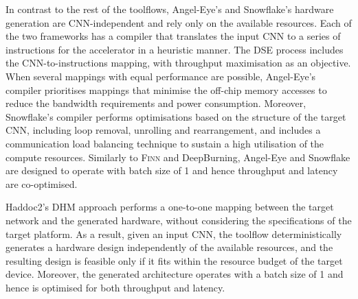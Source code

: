 \documentclass[format=acmsmall, review=false, screen=true]{acmart}
\begin{document}
In contrast to the rest of the toolflows, Angel-Eye's {\color{black}and Snowflake's} hardware generation are CNN-independent and rely only on the available resources. {\color{black}Each of the two frameworks has a compiler that translates the input CNN to a series of instructions for the accelerator in a heuristic manner.} The DSE process includes the CNN-to-instructions mapping, with throughput maximisation as an objective. When several mappings with equal performance are possible, Angel-Eye's compiler prioritises mappings that minimise the off-chip memory accesses to reduce the bandwidth requirements and power consumption. {\color{black}Moreover, Snowflake's compiler performs optimisations based on the structure of the target CNN, including loop removal, unrolling and rearrangement, and includes a communication load balancing technique to sustain a high utilisation of the compute resources.} Similarly to \textsc{Finn} and DeepBurning, Angel-Eye {\color{black}and Snowflake} are designed to operate with batch size of 1 and hence throughput and latency are co-optimised.

{\color{black}Haddoc2's DHM approach performs a one-to-one mapping between the target network and the generated hardware, without considering the specifications of the target platform. As a result, given an input CNN, the toolflow deterministically generates a hardware design independently of the available resources, and the resulting design is feasible only if it fits within the resource budget of the target device. Moreover, the generated architecture operates with a batch size of 1 and hence is optimised for both throughput and latency.}
\end{document}
